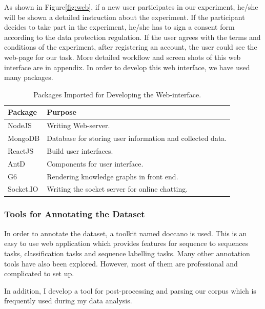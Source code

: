 \documentclass[bsc,frontabs,twoside,singlespacing,parskip,deptreport]{infthesis}     %
\begin{document}
As shown in Figure\ref{fig:web}, if a new user participates in our experiment, he/she will be shown a detailed instruction about the experiment. If the participant decides to take part in the experiment, he/she has to sign a consent form according to the data protection regulation. If the user agrees with the terms and conditions of the experiment, after registering an account, the user could see the web-page for our task. More detailed workflow and screen shots of this web interface are in appendix. In order to develop this web interface, we have used many packages.

\begin{table}[]
\centering
\begin{tabular}{|l|l|}
\hline
Package                  & Purpose                                                   \\ \hline
NodeJS\cite{nodejs}      & Writing Web-server.                                       \\ \hline
MongoDB\cite{monodb}     & Database for storing user information and collected data. \\ \hline
ReactJS\cite{react}      & Build user interfaces.                                    \\ \hline
AntD\cite{antd}           & Components for user interface.                  \\ \hline
G6\cite{g6}              & Rendering knowledge graphs in front end.                   \\ \hline
Socket.IO\cite{socketio} & Writing the socket server for online chatting.                \\ \hline
\end{tabular}
\caption{Packages Imported for Developing the Web-interface.}
\label{tab:packages}
\end{table}


\subsubsection{Tools for Annotating the Dataset}

In order to annotate the dataset, a toolkit named doccano\cite{doccano} is used. This is an easy to use web application which provides features for sequence to sequences tasks, classification tasks and sequence labelling tasks. Many other annotation tools have also been explored. However, most of them are professional and complicated to set up.

In addition, I develop a tool for post-processing and parsing our corpus which is frequently used during my data analysis.
\end{document}
